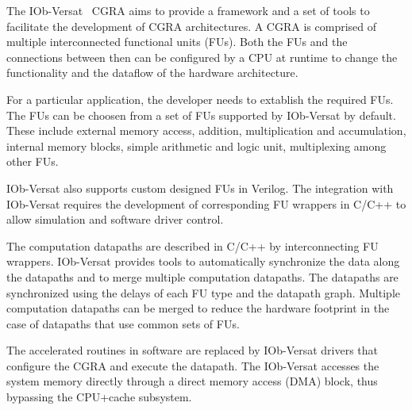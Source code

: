 The IOb-Versat~\cite{iob-versat} CGRA aims to provide a framework and a set of
tools to facilitate the development of CGRA architectures.
A CGRA is comprised of multiple interconnected functional units (FUs). Both the
FUs and the connections between then can be configured by a CPU at runtime to
change the functionality and the dataflow of the hardware architecture.

For a particular application, the developer needs to extablish the required
FUs. The FUs can be choosen from a set of FUs supported by IOb-Versat by
default. These include external memory access, addition, multiplication and
accumulation, internal memory blocks, simple arithmetic and logic unit,
multiplexing among other FUs.

IOb-Versat also supports custom designed FUs in Verilog. The integration with
IOb-Versat requires the development of corresponding FU wrappers in C/C++ to
allow simulation and software driver control.

The computation datapaths are described in C/C++ by interconnecting FU wrappers.
IOb-Versat provides tools to automatically synchronize the data along the
datapaths and to merge multiple computation datapaths.
The datapaths are synchronized using the delays of each FU type and the
datapath graph. 
Multiple computation datapaths can be merged to reduce the hardware footprint
in the case of datapaths that use common sets of FUs.

The accelerated routines in software are replaced by IOb-Versat drivers that
configure the CGRA and execute the datapath. The IOb-Versat accesses the system 
memory directly through a direct memory access (DMA) block, thus bypassing the 
CPU+cache subsystem.
